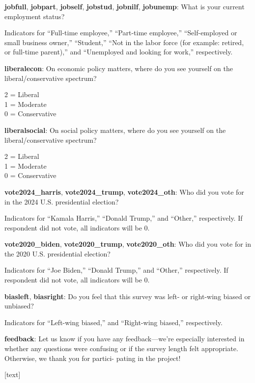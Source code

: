 \documentclass[11pt, headsepline]{article}
\begin{document}
\textbf{jobfull}, \textbf{jobpart}, \textbf{jobself}, \textbf{jobstud}, \textbf{jobnilf}, \textbf{jobunemp}: What is your current employment status?

Indicators for ``Full-time employee,'' ``Part-time employee,'' ``Self-employed or small business owner,'' ``Student,'' ``Not in the labor force (for example: retired, or full-time parent),'' and ``Unemployed and looking for work,'' respectively.



\textbf{liberalecon}: On economic policy matters, where do you see yourself on the liberal/conservative spectrum?

2 = Liberal \\
1 = Moderate \\
0 = Conservative

\textbf{liberalsocial}: On social policy matters, where do you see yourself on the liberal/conservative spectrum?

2 = Liberal \\
1 = Moderate \\
0 = Conservative

\textbf{vote2024\_harris}, \textbf{vote2024\_trump}, \textbf{vote2024\_oth}: Who did you vote for in the 2024 U.S. presidential election?

Indicators for ``Kamala Harris,'' ``Donald Trump,'' and ``Other,'' respectively. If respondent did not vote, all indicators will be 0.  

\textbf{vote2020\_biden}, \textbf{vote2020\_trump}, \textbf{vote2020\_oth}: Who did you vote for in the 2020 U.S. presidential election?

Indicators for ``Joe Biden,'' ``Donald Trump,'' and ``Other,'' respectively. If respondent did not vote, all indicators will be 0. 

\textbf{biasleft}, \textbf{biasright}: Do you feel that this survey was left- or right-wing biased or unbiased?

Indicators for ``Left-wing biased,'' and ``Right-wing biased,'' respectively.

\textbf{feedback}: Let us know if you have any feedback—we’re especially interested in whether any questions were confusing or if the survey length felt appropriate. Otherwise, we thank you for partici- pating in the project!

[text]
\end{document}
